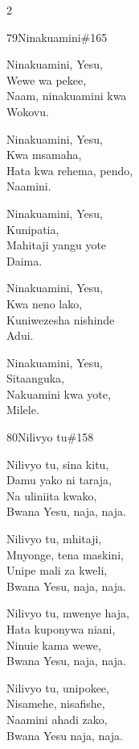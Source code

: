 \begin{multicols}{2}
\begin{hymn}{79}{Ninakuamini}{\#165}
\begin{stanza}
Ninakuamini, Yesu,\\
Wewe wa pekee,\\
Naam, ninakuamini kwa\\
Wokovu.
\end{stanza}
\begin{stanza}
Ninakuamini, Yesu,\\
Kwa msamaha,\\
Hata kwa rehema, pendo,\\
Naamini.
\end{stanza}
\begin{stanza}
Ninakuamini, Yesu,\\
Kunipatia,\\
Mahitaji yangu yote\\
Daima.
\end{stanza}
\begin{stanza}
Ninakuamini, Yesu,\\
Kwa neno lako,\\
Kuniwezesha nishinde\\
Adui.
\end{stanza}
\begin{stanza}
Ninakuamini, Yesu,\\
Sitaanguka,\\
Nakuamini kwa yote,\\
Milele.
\end{stanza}
\end{hymn}

\begin{hymn}{80}{Nilivyo tu}{\#158}
\begin{stanza}
Nilivyo tu, sina kitu,\\
Damu yako ni taraja,\\
Na uliniita kwako,\\
Bwana Yesu, naja, naja.
\end{stanza}
\begin{stanza}
Nilivyo tu, mhitaji,\\
Mnyonge, tena maskini,\\
Unipe mali za kweli,\\
Bwana Yesu, naja, naja.
\end{stanza}
\begin{stanza}
Nilivyo tu, mwenye haja,\\
Hata kuponywa niani,\\
Ninuie kama wewe,\\
Bwana Yesu, naja, naja.
\end{stanza}
\begin{stanza}
Nilivyo tu, unipokee,\\
Nisamehe, nisafishe,\\
Naamini ahadi zako,\\
Bwana Yesu naja, naja.
\end{stanza}
\end{hymn}


\end{multicols}

